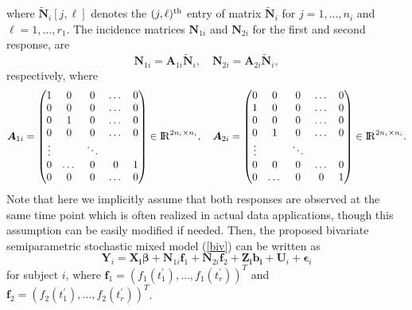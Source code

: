 \documentclass[article,lineno]{biometrika}
\begin{document}
where 
$\bm {\tilde N}_i [j, \ell]$ denotes the $(j, \ell)^{\rm th}$ entry of matrix $\bm {\tilde N}_i$ for $j = 1, \dots, n_i$ and $\ell = 1, \dots, r_1$. 
The incidence matrices $\boldsymbol N_{1i}$ and $\boldsymbol N_{2i}$ for the first and second response, are 
\[
\boldsymbol N_{1i} = \boldsymbol A_{1i} \boldsymbol {\tilde N} _i, \quad
\boldsymbol N_{2i} = \boldsymbol A_{2i} \boldsymbol {\tilde N}_i,
\]
respectively, where 
\[
\boldsymbol A_{1i} =
 \begin{pmatrix}
   1 & 0 & 0 &  \dots & 0 \\
  0 & 0 & 0 &   \dots & 0 \\
  0 & 1 & 0 & \dots & 0 \\
   0 & 0 & 0 &   \dots & 0  \\
  \vdots &  & \ddots &  \\ 
 0 & \dots & 0  & 0 & 1\\
  0 & 0 & 0 &   \dots & 0 \\
 \end{pmatrix}
   \in {\rm I\!R}^{2n_i \times n_i},
\quad
\boldsymbol A_{2i} =
  \begin{pmatrix}
 0 & 0 & 0 &   \dots & 0 \\
1 & 0 & 0 &  \dots & 0 \\
 0 & 0 & 0 &   \dots & 0\\
0 & 1 & 0 & \dots & 0\\
  \vdots &  & \ddots &  \\ 
0 & 0 & 0 &   \dots & 0\\
0 & \dots & 0  & 0 & 1 \\
 \end{pmatrix}
  \in {\rm I\!R}^{2n_i \times n_i}.
 \]
 Note that here we implicitly assume that both responses are observed at the same time point which is often realized in actual data applications, though this assumption can be easily modified if needed.
Then, the proposed bivariate semiparametric stochastic mixed model  (\ref{biv}) can be written as
$$
\boldsymbol Y_{i} 
=
\boldsymbol{X_{i}}\boldsymbol{\beta} +
 \boldsymbol N_{1i} \boldsymbol f_1 + 
  \boldsymbol N_{2i} \boldsymbol f_2 + 
\boldsymbol{Z_{i}}\boldsymbol{b_{i}} + 
\boldsymbol U_{i} + 
\boldsymbol \epsilon_{i}
$$
for subject $i$, where 
$\bm f_1 = (f_1(t_1^\prime), \dots, f_1(t_r^\prime))^T$
and 
$\bm f_2 = (f_2(t_1^\prime), \dots, f_2(t_r^\prime))^T$.

\end{document}
